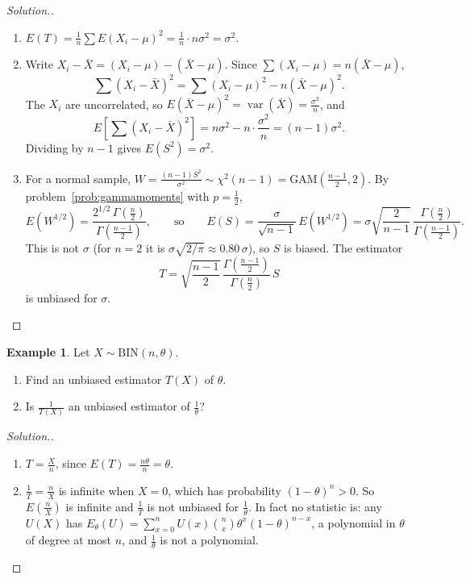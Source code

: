 \documentclass[12pt,a4paper]{report}
\theoremstyle{definition}
\newtheorem{exa}[thm]{Example}
\DeclareMathOperator{\var}{var}
\newenvironment{solution}
  {\renewcommand{\qedsymbol}{}\begin{proof}[\textit{Solution}.]}
  {\end{proof}}
\begin{document}
\begin{solution}
\begin{enumerate}
\item[(i)] $E(T) = \frac{1}{n}\sum E(X_i - \mu)^2 = \frac{1}{n}\cdot n\sigma^2 = \sigma^2$.
\item[(ii)] Write $X_i - \bar X = (X_i - \mu) - (\bar X - \mu)$. Since
$\sum (X_i - \mu) = n(\bar X - \mu)$,
\[\sum (X_i - \bar X)^2 = \sum (X_i - \mu)^2 - n(\bar X - \mu)^2 .\]
The $X_i$ are uncorrelated, so $E(\bar X - \mu)^2 = \var(\bar X) = \frac{\sigma^2}{n}$,
and
\[E\left[\sum (X_i - \bar X)^2\right] = n\sigma^2 - n\cdot\frac{\sigma^2}{n} = (n - 1)\sigma^2 .\]
Dividing by $n - 1$ gives $E(S^2) = \sigma^2$.
\item[(iii)] For a normal sample, $W = \frac{(n - 1)S^2}{\sigma^2}\sim\chi^2(n - 1)
= \text{GAM}\left(\frac{n - 1}{2}, 2\right)$. By problem~\ref{prob:gammamoments}
with $p = \frac12$,
\[E\left(W^{1/2}\right) = \frac{2^{1/2}\,\Gamma\left(\frac{n}{2}\right)}{\Gamma\left(\frac{n - 1}{2}\right)},
\qquad\text{so}\qquad
E(S) = \frac{\sigma}{\sqrt{n - 1}}\,E\left(W^{1/2}\right)
= \sigma\sqrt{\frac{2}{n - 1}}\,\frac{\Gamma\left(\frac{n}{2}\right)}{\Gamma\left(\frac{n - 1}{2}\right)} .\]
This is not $\sigma$ (for $n = 2$ it is $\sigma\sqrt{2/\pi}\approx 0.80\,\sigma$),
so $S$ is biased. The estimator
\[T = \sqrt{\frac{n - 1}{2}}\,\frac{\Gamma\left(\frac{n - 1}{2}\right)}{\Gamma\left(\frac{n}{2}\right)}\, S\]
is unbiased for $\sigma$.
\end{enumerate}
\end{solution}

\begin{exa}
\label{ex:binomialreciprocal}
Let $X\sim\text{BIN}(n, \theta)$.
\begin{enumerate}
\item[(i)] Find an unbiased estimator $T(X)$ of $\theta$.
\item[(ii)] Is $\frac{1}{T(X)}$ an unbiased estimator of $\frac{1}{\theta}$?
\end{enumerate}
\end{exa}

\begin{solution}
\begin{enumerate}
\item[(i)] $T = \frac{X}{n}$, since $E(T) = \frac{n\theta}{n} = \theta$.
\item[(ii)] $\frac1T = \frac nX$ is infinite when $X = 0$, which has probability
$(1 - \theta)^n>0$. So $E\left(\frac nX\right)$ is infinite and $\frac1T$ is not
unbiased for $\frac1\theta$. In fact no statistic is: any $U(X)$ has
$E_\theta(U) = \sum_{x=0}^n U(x)\binom nx\theta^x(1-\theta)^{n-x}$, a polynomial in
$\theta$ of degree at most $n$, and $\frac1\theta$ is not a polynomial.
\end{enumerate}
\end{solution}
\end{document}

